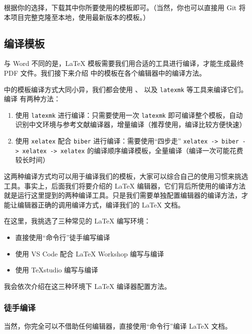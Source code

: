 根据你的选择，下载其中你所要使用的模板即可。（当然，你也可以直接用 Git 将本项目完整克隆至本地，使用最新版本的模板。）

\subsection{编译模板}

与 Word 不同的是，{\LaTeX} 模板需要我们用合适的工具进行编译，才能生成最终 PDF 文件。我们接下来介绍 {\BIThesis} 中的模板在各个编辑器中的编译方法。

{\BIThesis} 中的模板编译方式大同小异，我们都会使用 、 以及 \texttt{latexmk} 等工具来编译它们。编译 {\BIThesis} 有两种方法：

\begin{enumerate}
  \item 使用 \texttt{latexmk} 进行编译：只需要使用一次 \texttt{latexmk} 即可编译整个模板，自动识别中文环境与参考文献编译器，增量编译（推荐使用，编译比较方便快速）
  \item 使用 \texttt{xelatex} 配合 \texttt{biber} 进行编译：需要使用“四步走” \texttt{xelatex -> biber -> xelatex -> xelatex} 的编译顺序编译模板，全量编译（编译一次可能花费较长时间）
\end{enumerate}

这两种编译方式均可以用于编译我们的模板，大家可以综合自己的使用习惯来挑选工具。事实上，后面我们将要介绍的 {\LaTeX} 编辑器，它们背后所使用的编译方法就是运行这里提到的两种编译工具。只是我们需要单独配置编辑器的编译方法，才能让编辑器正确的调用编译方式，编译我们的 {\LaTeX} 文档。

在这里，我挑选了三种常见的 {\LaTeX} 编写环境：

\begin{itemize}
  \item 直接使用“命令行”徒手编写编译
  \item 使用 VS Code 配合 {\LaTeX} Workshop 编写与编译
  \item 使用 \TeX studio 编写与编译
\end{itemize}

我会依次介绍在这三种环境下 {\LaTeX} 编译器配置方法。

\subsubsection{徒手编译}


当然，你完全可以不借助任何编辑器，直接使用“命令行”编译 {\LaTeX} 文档。

